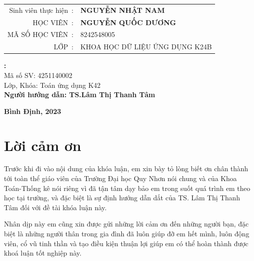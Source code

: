 \documentclass[14pt,oneside,a4paper]{report}
\numberwithin{equation}{section}
\begin{document}
\begin{center}
\begin{center}
	\begin{table}[!htb]
		\centering
		\fontsize{14pt}{14pt}\selectfont 
		\begin{tabular}{rl}	
			 Sinh viên thực hiện~:&\textbf{NGUYỄN NHẬT NAM} \\
			HỌC VIÊN~:&\textbf{NGUYỄN QUỐC DƯƠNG} \\
			MÃ SỐ HỌC VIÊN~: &8242548005\\
			LỚP~:&KHOA HỌC DỮ LIỆU ỨNG DỤNG K24B\\
		\end{tabular}
	\end{table}
\end{center}
\end{center}


\begin{flushleft}
	{\bf\fontsize{16pt}{22}\selectfont:  }\\
	\vskip 0.05cm
	{\fontsize{16pt}{22}\selectfont Mã số SV: 4251140002}\\
	\vskip 0.05cm
	{\fontsize{16pt}{22}\selectfont Lớp, Khóa: Toán ứng dụng K42}\\
	\vskip 2cm
	{\bf\fontsize{16pt}{22}\selectfont Người hướng dẫn: TS.Lâm Thị Thanh Tâm}\\
\end{flushleft}


\vfill
\begin{center}
	{\bf\fontsize{14pt}{16pt}\selectfont Bình Định, 2023}
\end{center}

\newpage
\chapter*{Lời cảm ơn}

	Trước khi đi vào nội dung của khóa luận, em xin bày tỏ lòng biết ơn chân thành tới toàn thể giáo viên của Trường Đại học Quy Nhơn nói chung và của Khoa Toán-Thống kê nói riêng vì đã tận tâm dạy bảo em trong suốt quá trình em theo học tại trường, và đặc biệt là sự định hướng dẫn dắt của TS. Lâm Thị Thanh Tâm đối với đề tài khóa luận này.
	
	Nhân dịp này em cũng xin được gửi những lời cảm ơn đến những người bạn, đặc biệt là những người thân trong gia đình đã luôn giúp đỡ em hết mình, luôn động viên, cổ vũ tinh thần và tạo điều kiện thuận lợi giúp em có thể hoàn thành được khoá luận tốt nghiệp này.
	
\end{document}
